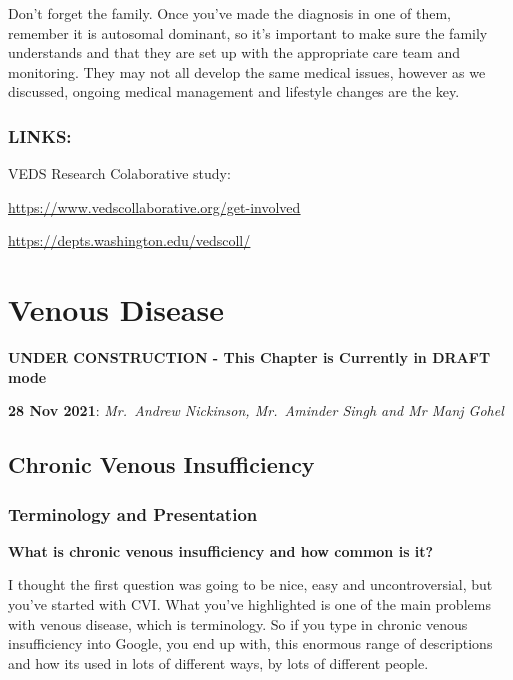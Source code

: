 \documentclass[
]{book}
\begin{document}
Don't forget the family. Once you've made the diagnosis in one of them,
remember it is autosomal dominant, so it's important to make sure the
family understands and that they are set up with the appropriate care
team and monitoring. They may not all develop the same medical issues,
however as we discussed, ongoing medical management and lifestyle
changes are the key.

\hypertarget{links}{%
\subsection{LINKS:}\label{links}}

VEDS Research Colaborative study:

\href{https://www.vedscollaborative.org/get-involved}{\uline{https://www.vedscollaborative.org/get-involved}}

\href{https://depts.washington.edu/vedscoll/}{\uline{https://depts.washington.edu/vedscoll/}}

\hypertarget{venous-disease}{%
\chapter{Venous Disease}\label{venous-disease}}

\textbf{UNDER CONSTRUCTION - This Chapter is Currently in DRAFT mode}

\textbf{28 Nov 2021}: \emph{Mr.~Andrew Nickinson, Mr.~Aminder Singh and Mr Manj
Gohel}

\hypertarget{chronic-venous-insufficiency}{%
\section{Chronic Venous Insufficiency}\label{chronic-venous-insufficiency}}

\hypertarget{terminology-and-presentation}{%
\subsection{Terminology and Presentation}\label{terminology-and-presentation}}

\textbf{What is chronic venous insufficiency and how common is it?}

I thought the first question was going to be nice, easy and
uncontroversial, but you've started with CVI. What you've highlighted is
one of the main problems with venous disease, which is terminology. So
if you type in chronic venous insufficiency into Google, you end up
with, this enormous range of descriptions and how its used in lots of
different ways, by lots of different people.
\end{document}
